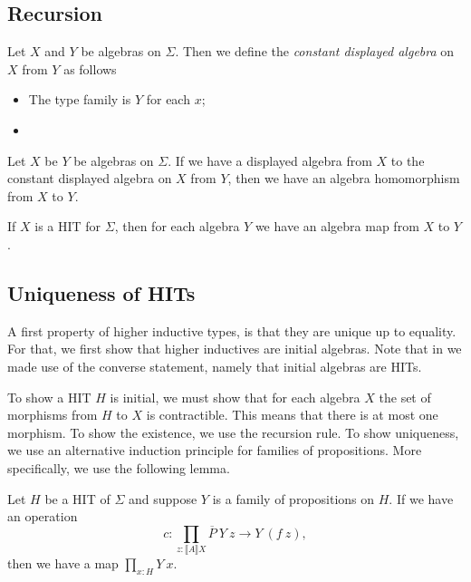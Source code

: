 \documentclass[9pt]{entcs}
\newcommand{\deprod}[3]{\prod_{#1 : #2} #3} %
\newcommand{\0}{\textbf{0}} %
\newcommand{\1}{\textbf{1}} %
\newcommand{\semP}[1]{\llbracket #1 \rrbracket} %
\newcommand{\polydact}[2]{\overline{#1} \> #2}
\begin{document}
\subsection{Recursion}

\begin{definition}
Let $X$ and $Y$ be algebras on $\Sigma$.
Then we define the \emph{constant displayed algebra} on $X$ from $Y$ as follows
\begin{itemize}
	\item The type family is $Y$ for each $x$;
	\item
\end{itemize}
\end{definition}

\begin{proposition}
Let $X$ be $Y$ be algebras on $\Sigma$.
If we have a displayed algebra from $X$ to the constant displayed algebra on $X$ from $Y$, then we have an algebra homomorphism from $X$ to $Y$.
\end{proposition}

\begin{corollary}
If $X$ is a HIT for $\Sigma$, then for each algebra $Y$ we have an algebra map from $X$ to $Y$.
\end{corollary}

\subsection{Uniqueness of HITs}
A first property of higher inductive types, is that they are unique up to equality.
For that, we first show that higher inductives are initial algebras.
Note that in  we made use of the converse statement, namely that initial algebras are HITs.

To show a HIT $H$ is initial, we must show that for each algebra $X$ the set of morphisms from $H$ to $X$ is contractible.
This means that there is at most one morphism.
To show the existence, we use the recursion rule.
To show uniqueness, we use an alternative induction principle for families of propositions.
More specifically, we use the following lemma.

\begin{lemma}
Let $H$ be a HIT of $\Sigma$ and suppose $Y$ is a family of propositions on $H$.
If we have an operation
\[
c : \deprod{z}{\semP{A}{X}}{\polydact{P}{Y} \> z \rightarrow Y \> (f \> z)},
\]
then we have a map $\deprod{x}{H}{Y \> x}$.
\end{lemma}
\end{document}
